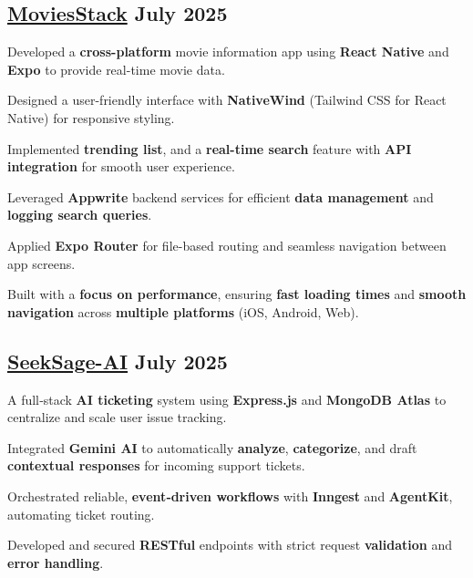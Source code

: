 \subsection{{\href{https://www.linkedin.com/posts/thepratikguptaa_reactnative-mobileappdevelopment-javascript-activity-7355569914809589761-B4uv}{MoviesStack} \hfill July 2025}}
\begin{zitemize}
\item Developed a \textbf{cross-platform} movie information app using \textbf{React Native} and \textbf{Expo} to provide real-time movie data.
\item Designed a user-friendly interface with \textbf{NativeWind} (Tailwind CSS for React Native) for responsive styling.
\item Implemented \textbf{trending list}, and a \textbf{real-time search} feature with \textbf{API integration} for smooth user experience.
\item Leveraged \textbf{Appwrite} backend services for efficient \textbf{data management} and \textbf{logging search queries}.
\item Applied \textbf{Expo Router} for file-based routing and seamless navigation between app screens.
\item Built with a \textbf{focus on performance}, ensuring \textbf{fast loading times} and \textbf{smooth navigation }across \textbf{multiple platforms} (iOS, Android, Web).
\end{zitemize}

\subsection{{\href{https://github.com/thepratikguptaa/SeekSage-AI}{SeekSage-AI} \hfill July 2025}}
\begin{zitemize}
\item A full‑stack \textbf{AI ticketing} system using \textbf{Express.js} and \textbf{MongoDB Atlas} to centralize and scale user issue tracking.
\item Integrated \textbf{Gemini AI} to automatically \textbf{analyze}, \textbf{categorize}, and draft \textbf{contextual responses} for incoming support tickets.
\item Orchestrated reliable, \textbf{event‑driven workflows} with \textbf{Inngest} and \textbf{AgentKit}, automating ticket routing.
\item Developed and secured \textbf{RESTful} endpoints with strict request \textbf{validation} and \textbf{error handling}.
\end{zitemize}

